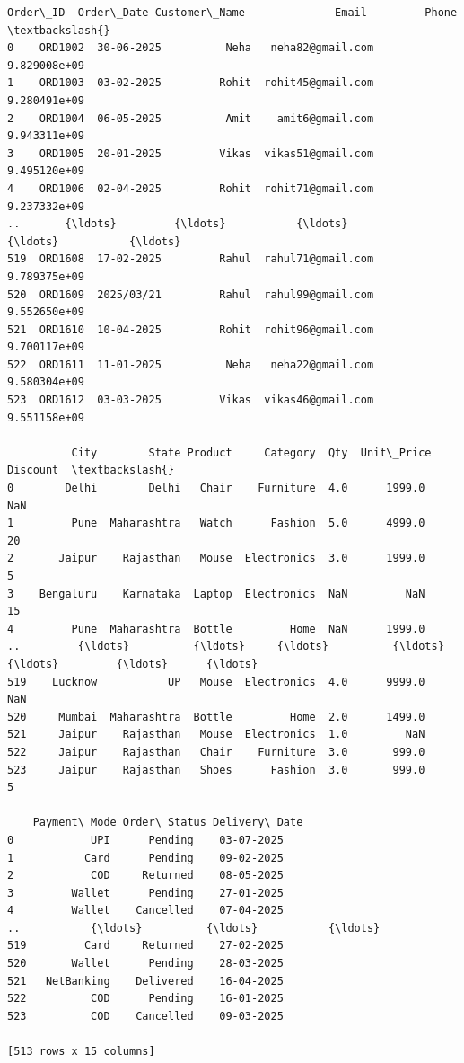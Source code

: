 \documentclass[11pt]{article}
\makeatletter
\newcommand{\boxspacing}{\kern\kvtcb@left@rule\kern\kvtcb@boxsep}
\newcommand{\prompt}[4]{
        {\ttfamily\llap{{\color{#2}[#3]:\hspace{3pt}#4}}\vspace{-\baselineskip}}
    }
\makeatother
\begin{document}
            \begin{tcolorbox}[breakable, size=fbox, boxrule=.5pt, pad at break*=1mm, opacityfill=0]
\prompt{Out}{outcolor}{14}{\boxspacing}
\begin{Verbatim}[commandchars=\\\{\}]
    Order\_ID  Order\_Date Customer\_Name              Email         Phone  \textbackslash{}
0    ORD1002  30-06-2025          Neha   neha82@gmail.com  9.829008e+09
1    ORD1003  03-02-2025         Rohit  rohit45@gmail.com  9.280491e+09
2    ORD1004  06-05-2025          Amit    amit6@gmail.com  9.943311e+09
3    ORD1005  20-01-2025         Vikas  vikas51@gmail.com  9.495120e+09
4    ORD1006  02-04-2025         Rohit  rohit71@gmail.com  9.237332e+09
..       {\ldots}         {\ldots}           {\ldots}                {\ldots}           {\ldots}
519  ORD1608  17-02-2025         Rahul  rahul71@gmail.com  9.789375e+09
520  ORD1609  2025/03/21         Rahul  rahul99@gmail.com  9.552650e+09
521  ORD1610  10-04-2025         Rohit  rohit96@gmail.com  9.700117e+09
522  ORD1611  11-01-2025          Neha   neha22@gmail.com  9.580304e+09
523  ORD1612  03-03-2025         Vikas  vikas46@gmail.com  9.551158e+09

          City        State Product     Category  Qty  Unit\_Price Discount  \textbackslash{}
0        Delhi        Delhi   Chair    Furniture  4.0      1999.0      NaN
1         Pune  Maharashtra   Watch      Fashion  5.0      4999.0       20
2       Jaipur    Rajasthan   Mouse  Electronics  3.0      1999.0        5
3    Bengaluru    Karnataka  Laptop  Electronics  NaN         NaN       15
4         Pune  Maharashtra  Bottle         Home  NaN      1999.0
..         {\ldots}          {\ldots}     {\ldots}          {\ldots}  {\ldots}         {\ldots}      {\ldots}
519    Lucknow           UP   Mouse  Electronics  4.0      9999.0      NaN
520     Mumbai  Maharashtra  Bottle         Home  2.0      1499.0
521     Jaipur    Rajasthan   Mouse  Electronics  1.0         NaN
522     Jaipur    Rajasthan   Chair    Furniture  3.0       999.0
523     Jaipur    Rajasthan   Shoes      Fashion  3.0       999.0        5

    Payment\_Mode Order\_Status Delivery\_Date
0            UPI      Pending    03-07-2025
1           Card      Pending    09-02-2025
2            COD     Returned    08-05-2025
3         Wallet      Pending    27-01-2025
4         Wallet    Cancelled    07-04-2025
..           {\ldots}          {\ldots}           {\ldots}
519         Card     Returned    27-02-2025
520       Wallet      Pending    28-03-2025
521   NetBanking    Delivered    16-04-2025
522          COD      Pending    16-01-2025
523          COD    Cancelled    09-03-2025

[513 rows x 15 columns]
\end{Verbatim}
\end{tcolorbox}
        
\end{document}
